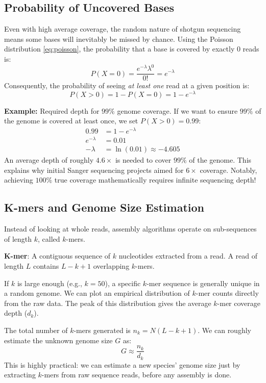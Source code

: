 \documentclass[11pt, a4paper]{article}
\begin{document}
\subsection{Probability of Uncovered Bases}
Even with high average coverage, the random nature of shotgun sequencing means some bases will inevitably be missed by chance. Using the Poisson distribution \eqref{eq:poisson}, the probability that a base is covered by exactly $0$ reads is:
\[ P(X = 0) = \frac{e^{-\lambda} \lambda^0}{0!} = e^{-\lambda} \]
Consequently, the probability of seeing \textit{at least one} read at a given position is:
\[ P(X > 0) = 1 - P(X = 0) = 1 - e^{-\lambda} \]

\textbf{Example:} Required depth for $99\%$ genome coverage.
If we want to ensure $99\%$ of the genome is covered at least once, we set $P(X > 0) = 0.99$:
\begin{align*}
    0.99 &= 1 - e^{-\lambda} \\
    e^{-\lambda} &= 0.01 \\
    -\lambda &= \ln(0.01) \approx -4.605
\end{align*}
An average depth of roughly $4.6\times$ is needed to cover $99\%$ of the genome. This explains why initial Sanger sequencing projects aimed for $6\times$ coverage. Notably, achieving $100\%$ true coverage mathematically requires infinite sequencing depth!

\subsection{K-mers and Genome Size Estimation}
Instead of looking at whole reads, assembly algorithms operate on sub-sequences of length $k$, called $k$-mers. 

\begin{important}
    \textbf{K-mer}: A contiguous sequence of $k$ nucleotides extracted from a read. A read of length $L$ contains $L - k + 1$ overlapping $k$-mers.
\end{important}

If $k$ is large enough (e.g., $k=50$), a specific $k$-mer sequence is generally unique in a random genome. We can plot an empirical distribution of $k$-mer counts directly from the raw data. The peak of this distribution gives the average $k$-mer coverage depth ($d_k$).

The total number of $k$-mers generated is $n_k = N(L - k + 1)$. We can roughly estimate the unknown genome size $G$ as:
\[ G \approx \frac{n_k}{d_k} \]
This is highly practical: we can estimate a new species' genome size just by extracting $k$-mers from raw sequence reads, before any assembly is done.
\end{document}
